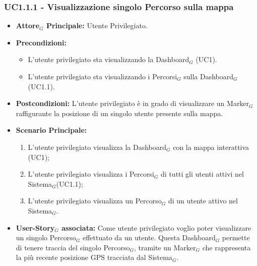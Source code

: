 \documentclass[10pt]{article}
\begin{document}
\begin{justify}
\subsubsection{\textbf{UC1.1.1 - Visualizzazione singolo Percorso sulla mappa}}
\label{UC1.1.1}
\begin{itemize}
     \item \textbf{Attore$_G$ Principale:} Utente Privilegiato.
     \item \textbf{Precondizioni:}
        \begin{itemize}
    		\item L'utente privilegiato sta visualizzando la Dashboard$_G$ (UC1).
    		\item L'utente privilegiato sta visualizzando i Percorsi$_G$ sulla Dashboard$_G$ (UC1.1).
        \end{itemize}
     \item \textbf{Postcondizioni:} L'utente privilegiato è in grado di visualizzare un Marker$_G$ raffigurante la posizione di un singolo utente presente sulla mappa.
     \item \textbf{Scenario Principale:}
        \begin{enumerate}
            \item L'utente privilegiato visualizza la Dashboard$_G$ con la mappa interattiva (UC1);
            \item L'utente privilegiato visualizza i Percorsi$_G$ di tutti gli utenti attivi nel Sistema$_G$(UC1.1);
            \item L'utente privilegiato visualizza un Percorso$_G$ di un utente attivo nel Sistema$_G$.
        \end{enumerate}
     \item \textbf{User-Story$_G$ associata:}
     Come utente privilegiato voglio poter visualizzare un singolo Percorso$_G$ effettuato da un utente. Questa Dashboard$_G$ permette di tenere traccia del singolo Percorso$_G$, tramite un Marker$_G$ che rappresenta la più recente posizione GPS tracciata dal Sistema$_G$.
\end{itemize}

\end{justify}
\end{document}
